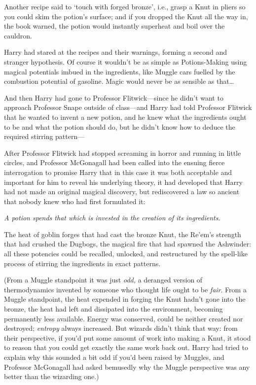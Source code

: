 Another recipe said to ‘touch with forged bronze’, i.e., grasp a Knut in pliers so you could skim the potion’s surface; and if you dropped the Knut all the way in, the book warned, the potion would instantly superheat and boil over the cauldron.

Harry had stared at the recipes and their warnings, forming a second and stranger hypothesis. Of course it wouldn’t be as simple as Potions-Making using magical potentials imbued in the ingredients, like Muggle cars fuelled by the combustion potential of gasoline. Magic would never be as sensible as that…

And then Harry had gone to Professor Flitwick—since he didn’t want to approach Professor Snape outside of class—and Harry had told Professor Flitwick that he wanted to invent a new potion, and he knew what the ingredients ought to be and what the potion should do, but he didn’t know how to deduce the required stirring pattern—

After Professor Flitwick had stopped screaming in horror and running in little circles, and Professor McGonagall had been called into the ensuing fierce interrogation to promise Harry that in this case it was both acceptable and important for him to reveal his underlying theory, it had developed that Harry had not made an original magical discovery, but rediscovered a law so ancient that nobody knew who had first formulated it:

\emph{A potion spends that which is invested in the creation of its ingredients.}

The heat of goblin forges that had cast the bronze Knut, the Re’em’s strength that had crushed the Dugbogs, the magical fire that had spawned the Ashwinder: all these potencies could be recalled, unlocked, and restructured by the spell-like process of stirring the ingredients in exact patterns.

(From a Muggle standpoint it was just \emph{odd,} a deranged version of thermodynamics invented by someone who thought life ought to be \emph{fair}. From a Muggle standpoint, the heat expended in forging the Knut hadn’t gone into the bronze, the heat had left and dissipated into the environment, becoming permanently less available. Energy was conserved, could be neither created nor destroyed; \emph{entropy} always increased. But wizards didn’t think that way: from their perspective, if you’d put some amount of work into making a Knut, it stood to reason that you could get exactly the same work back out. Harry had tried to explain why this sounded a bit odd if you’d been raised by Muggles, and Professor McGonagall had asked bemusedly why the Muggle perspective was any better than the wizarding one.)

